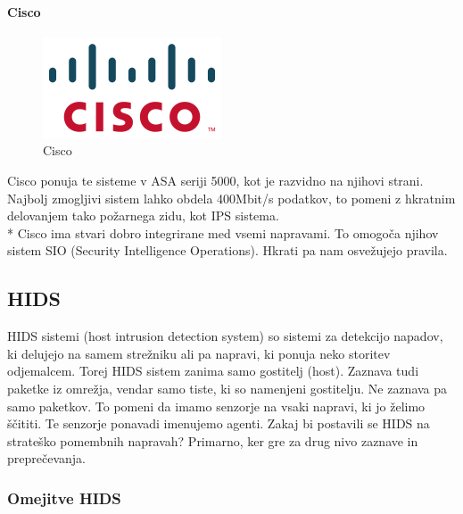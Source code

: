 \documentclass[12pt]{article}
\begin{document}
\paragraph{Cisco} %
\label{par:Cisco}


\begin{figure}[htb]
\begin{center}
\includegraphics[scale=0.7]{cisco_logo.png}
\end{center}
\caption{Cisco}
\label{cisco_img}
\end{figure}

Cisco ponuja te sisteme v ASA seriji 5000\cite{cisco5000}, kot je razvidno na njihovi strani.
Najbolj zmogljivi sistem lahko obdela 400Mbit/s podatkov, to pomeni z hkratnim delovanjem tako požarnega zidu, kot IPS sistema. 
\\*
Cisco ima stvari dobro integrirane med vsemi napravami. To omogoča njihov sistem SIO (Security Intelligence Operations). Hkrati pa nam osvežujejo pravila.





\subsection{HIDS}

HIDS sistemi (host intrusion detection system) so sistemi za detekcijo napadov, ki delujejo na samem strežniku ali pa napravi,
ki ponuja neko storitev odjemalcem.
Torej HIDS sistem zanima samo gostitelj (host).
Zaznava tudi paketke iz omrežja, vendar samo tiste, ki so namenjeni gostitelju.
Ne zaznava pa samo paketkov.
To pomeni da imamo senzorje na vsaki napravi, ki jo želimo ščititi.
Te senzorje ponavadi imenujemo agenti.
Zakaj bi postavili se HIDS na strateško pomembnih napravah?
Primarno, ker gre za drug nivo zaznave in preprečevanja. 

\subsubsection{Omejitve HIDS} %
\end{document}
